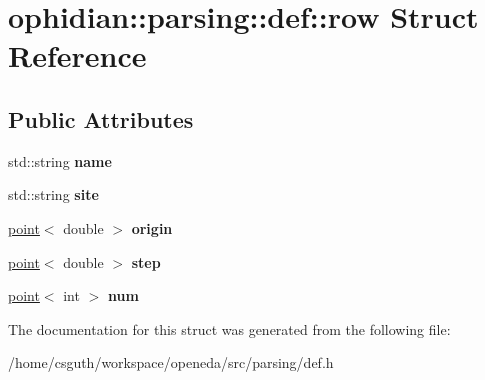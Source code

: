 \hypertarget{structophidian_1_1parsing_1_1def_1_1row}{\section{ophidian\-:\-:parsing\-:\-:def\-:\-:row Struct Reference}
\label{structophidian_1_1parsing_1_1def_1_1row}
}
\subsection*{Public Attributes}
\begin{DoxyCompactItemize}
\item 
\hypertarget{structophidian_1_1parsing_1_1def_1_1row_ab271fa1791c2f62e5f1fa38848dc4bce}{std\-::string {\bfseries name}}\label{structophidian_1_1parsing_1_1def_1_1row_ab271fa1791c2f62e5f1fa38848dc4bce}

\item 
\hypertarget{structophidian_1_1parsing_1_1def_1_1row_a0fa5a563cb3cb03aa2dcc05b20523d80}{std\-::string {\bfseries site}}\label{structophidian_1_1parsing_1_1def_1_1row_a0fa5a563cb3cb03aa2dcc05b20523d80}

\item 
\hypertarget{structophidian_1_1parsing_1_1def_1_1row_a5cca22cb2253e0ac77ca4e3b4c493962}{\hyperlink{structophidian_1_1parsing_1_1def_1_1point}{point}$<$ double $>$ {\bfseries origin}}\label{structophidian_1_1parsing_1_1def_1_1row_a5cca22cb2253e0ac77ca4e3b4c493962}

\item 
\hypertarget{structophidian_1_1parsing_1_1def_1_1row_a7b25e153527aed5dbd50e78b62924548}{\hyperlink{structophidian_1_1parsing_1_1def_1_1point}{point}$<$ double $>$ {\bfseries step}}\label{structophidian_1_1parsing_1_1def_1_1row_a7b25e153527aed5dbd50e78b62924548}

\item 
\hypertarget{structophidian_1_1parsing_1_1def_1_1row_a9878f297f54058e764e328640ae0e09c}{\hyperlink{structophidian_1_1parsing_1_1def_1_1point}{point}$<$ int $>$ {\bfseries num}}\label{structophidian_1_1parsing_1_1def_1_1row_a9878f297f54058e764e328640ae0e09c}

\end{DoxyCompactItemize}


The documentation for this struct was generated from the following file\-:\begin{DoxyCompactItemize}
\item 
/home/csguth/workspace/openeda/src/parsing/def.\-h\end{DoxyCompactItemize}
